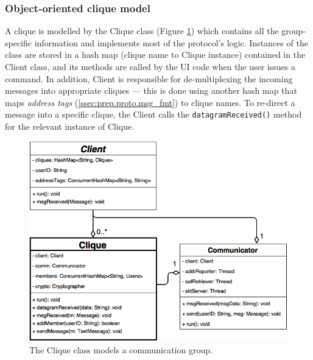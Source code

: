 \documentclass[a4paper, 12pt]{report}
\begin{document}
\subsubsection{Object-oriented clique model}
A clique is modelled by the Clique class (Figure \ref{fig:clique_uml}) which contains all the group-specific information and implements most of the protocol's logic. Instances of the class are stored in a hash map (clique name to Clique instance) contained in the Client class, and its methods are called by the UI code when the user issues a command. In addition, Client is responsible for de-multiplexing the incoming messages into appropriate cliques --- this is done using another hash map that maps \emph{address tags} (\cref{ssec:prep.proto.msg_fmt}) to clique names. To re-direct a message into a specific clique, the Client calls the \texttt{datagramReceived()} method for the relevant instance of Clique.
\begin{figure}[H]
    \centering
    \includegraphics[width=0.8\linewidth]{pics/clique_uml.png}
    \caption{\label{fig:clique_uml} The Clique class models a communication group.}
\end{figure}
\end{document}
